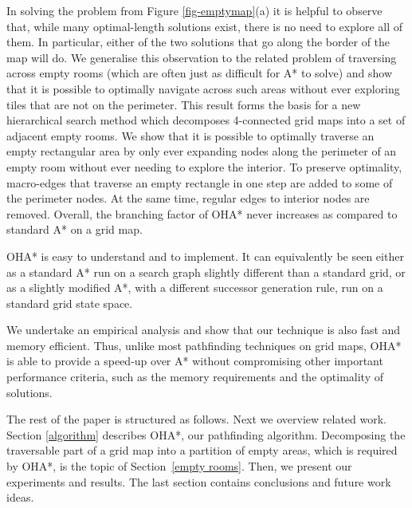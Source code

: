 In solving the problem from Figure \ref{fig-emptymap}(a) it is helpful to observe that,
while many optimal-length solutions exist, there is no need to explore all of them.
In particular, either of the two solutions that go along the border of the map will do.
We generalise this observation to the related problem of traversing across empty rooms (which are 
often just as difficult for A* to solve) and show that it is possible to optimally navigate across 
such areas without ever exploring tiles that are not on the perimeter.
This result forms the basis for a new hierarchical search method which decomposes 4-connected grid maps
into a set of adjacent empty rooms. 
We show that it is possible to optimally traverse an empty rectangular area by only ever expanding nodes along the perimeter of an empty room without ever needing to explore the interior.
To preserve optimality, macro-edges that traverse an empty rectangle in one step are added to some of the perimeter nodes. 
At the same time, regular edges to interior nodes are removed.
Overall, the branching factor of OHA* never increases as compared to standard A* on a grid map.

OHA* is easy to understand and to implement. It can equivalently be seen either as
a standard A* run on a search graph slightly different than a standard grid, or
as a slightly modified A*, with a different successor generation rule,
run on a standard grid state space.

We undertake an empirical analysis and show that our technique is also fast and memory efficient.
Thus, unlike most pathfinding techniques on grid maps, OHA* is able to provide a speed-up over A*
without compromising other important performance criteria, such as the memory requirements
and the optimality of solutions.

The rest of the paper is structured as follows.
Next we overview related work.
Section \ref{algorithm} describes OHA*, our pathfinding algorithm.
Decomposing the traversable part of a grid map into a partition of empty areas,
which is required by OHA*, is the topic of Section~\ref{empty rooms}.
Then, we present our experiments and results.
The last section contains conclusions and future work ideas.



